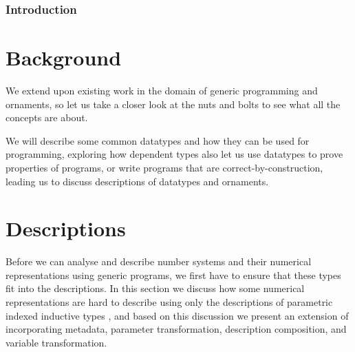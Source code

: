 \documentclass[10pt]{article}
\theoremstyle{plain}
\theoremstyle{definition}
\newcommand{\AD}[1]{\AgdaDatatype{#1}}
\newcommand{\marker}[1]{\todo[color=green]{#1}}
\begin{document}
\listoftodos


\section{Introduction}\label{sec:introduction}



\part*{Background}\label{part:background}
\marker{Start A}
We extend upon existing work in the domain of generic programming and ornaments, so let us take a closer look at the nuts and bolts to see what all the concepts are about.

We will describe some common datatypes and how they can be used for programming, exploring how dependent types also let us use datatypes to prove properties of programs, or write programs that are correct-by-construction, leading us to discuss descriptions of datatypes and ornaments.




\part{Descriptions}\label{part:descriptions}
Before we can analyse and describe number systems and their numerical representations using generic programs, we first have to ensure that these types fit into the descriptions. In this section we discuss how some numerical representations are hard to describe using only the descriptions of parametric indexed inductive types \AD{U-ix}, and based on this discussion we present an extension of \AD{U-ix} incorporating metadata, parameter transformation, description composition, and variable transformation.



\end{document}
